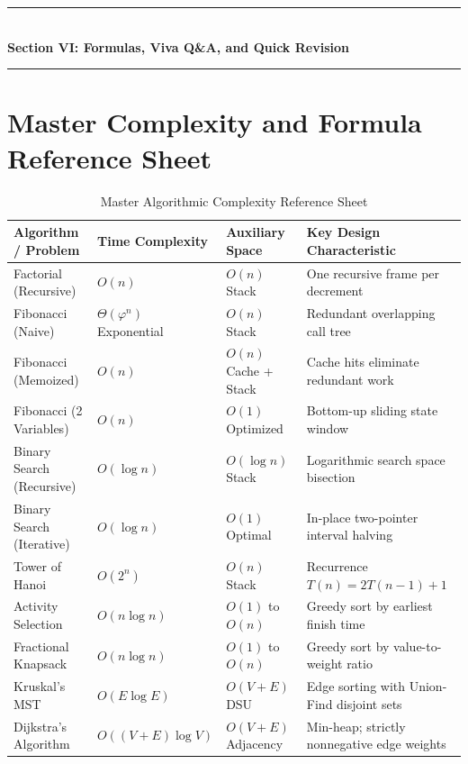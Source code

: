 \newpage
\begin{center}
\vspace{0.5em}
{\color{primary}\rule{0.45\textwidth}{1.2pt}}\\[4pt]
{\Large\bfseries\color{primary} Section VI: Formulas, Viva Q\&A, and Quick Revision}\\[2pt]
{\color{primary}\rule{0.45\textwidth}{1.2pt}}
\vspace{0.5em}
\end{center}


\section{Master Complexity and Formula Reference Sheet}

\begin{table}[htbp]
\centering
\caption{Master Algorithmic Complexity Reference Sheet}
\label{tab:master_complexity_sheet}
\begin{tabularx}{\textwidth}{p{4.2cm} p{3.2cm} p{3.2cm} X}
\toprule
\textbf{Algorithm / Problem} & \textbf{Time Complexity} & \textbf{Auxiliary Space} & \textbf{Key Design Characteristic} \\
\midrule
Factorial (Recursive) & $O(n)$ & $O(n)$ Stack & One recursive frame per decrement \\
Fibonacci (Naive) & $\Theta(\varphi^n)$ Exponential & $O(n)$ Stack & Redundant overlapping call tree \\
Fibonacci (Memoized) & $O(n)$ & $O(n)$ Cache + Stack & Cache hits eliminate redundant work \\
Fibonacci (2 Variables) & $O(n)$ & $O(1)$ Optimized & Bottom-up sliding state window \\
Binary Search (Recursive) & $O(\log n)$ & $O(\log n)$ Stack & Logarithmic search space bisection \\
Binary Search (Iterative) & $O(\log n)$ & $O(1)$ Optimal & In-place two-pointer interval halving \\
Tower of Hanoi & $O(2^n)$ & $O(n)$ Stack & Recurrence $T(n) = 2T(n-1) + 1$ \\
Activity Selection & $O(n \log n)$ & $O(1)$ to $O(n)$ & Greedy sort by earliest finish time \\
Fractional Knapsack & $O(n \log n)$ & $O(1)$ to $O(n)$ & Greedy sort by value-to-weight ratio \\
Kruskal's MST & $O(E \log E)$ & $O(V + E)$ DSU & Edge sorting with Union-Find disjoint sets \\
Dijkstra's Algorithm & $O((V+E)\log V)$ & $O(V + E)$ Adjacency & Min-heap; strictly nonnegative edge weights \\

\end{tabularx}
\end{table}
